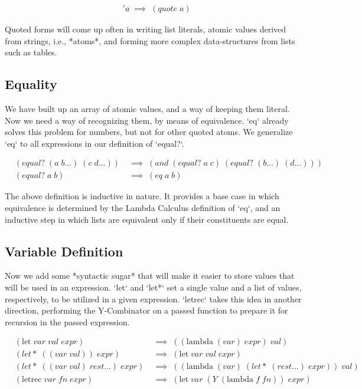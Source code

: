 \begin{align*}
& 'a \; \implies \; (quote \; a)
\end{align*}

Quoted forms will come up often in writing list literals, atomic values derived 
from strings, i.e., *atoms*, and forming more complex data-structures from lists 
such as tables.

\subsection{Equality}
We have built up an array of atomic values, and a way of keeping them literal. Now 
we need a way of recognizing them, by means of equivalence. `eq` already solves 
this problem for numbers, but not for other quoted atoms. We generalize `eq` to 
all expressions in our definition of `equal?`.

\begin{align*}
& (equal? \; (a \; b\dots) \; (c \; d\dots)) \; &\implies \; (and \; (equal? \; a \; c) \; (equal? \; (b\dots) \; (d\dots)))
\\& (equal? \; a \; b) \; &\implies \; (eq \; a \; b)
\end{align*}

The above definition is inductive in nature. It provides a base case in which 
equivalence is determined by the Lambda Calculus definition of `eq`, and an 
inductive step in which lists are equivalent only if their constituents are equal.

\subsection{Variable Definition}
Now we add some *syntactic sugar* that will make it easier to store values that 
will be used in an expression. `let` and `let*` set a single value and a list of 
values, respectively, to be utilized in a given expression. `letrec` takes this 
idea in another direction, performing the Y-Combinator on a passed function to 
prepare it for recursion in the passed expression.

\begin{align*}
& (\text{let} \; var \; val \; expr) \; &\implies \; ((\text{lambda} \; (var) \; expr) \; val)
\\& (let* \; ((var \; val)) \; expr) \; &\implies \; (\text{let} \; var \; val \; expr)
\\& (let* \; ((var \; val) \; rest\dots) \; expr) \; &\implies \; ((\text{lambda} \; (var) \; (let* \; (rest\dots) \; expr)) \; val)
\\& (\text{letrec} \; var \; fn \; expr) \; &\implies \; (\text{let} \; var \; (Y \; (\text{lambda} \; f \; fn)) \; expr)
\end{align*}

